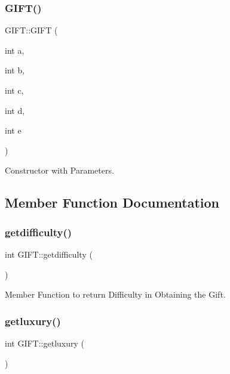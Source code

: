 \subsubsection{\texorpdfstring{G\+I\+F\+T()}{GIFT()}\hspace{0.1cm}{\footnotesize\ttfamily [2/2]}}
{\footnotesize\ttfamily G\+I\+F\+T\+::\+G\+I\+FT (\begin{DoxyParamCaption}\item[{int}]{a,  }\item[{int}]{b,  }\item[{int}]{c,  }\item[{int}]{d,  }\item[{int}]{e }\end{DoxyParamCaption})}



Constructor with Parameters. 



\subsection{Member Function Documentation}
\mbox{\label{class_g_i_f_t_a9b63acd1d421404203f852d0db61e60e}} 
\subsubsection{\texorpdfstring{getdifficulty()}{getdifficulty()}}
{\footnotesize\ttfamily int G\+I\+F\+T\+::getdifficulty (\begin{DoxyParamCaption}{ }\end{DoxyParamCaption})}



Member Function to return Difficulty in Obtaining the Gift. 

\mbox{\label{class_g_i_f_t_a65c3cc597b9c9b588d015ce07aec06a0}} 
\subsubsection{\texorpdfstring{getluxury()}{getluxury()}}
{\footnotesize\ttfamily int G\+I\+F\+T\+::getluxury (\begin{DoxyParamCaption}{ }\end{DoxyParamCaption})}



